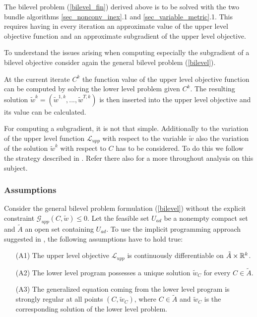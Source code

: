 The bilevel problem (\ref{bilevel_fin}) derived above is to be solved with the two bundle algorithms \ref{sec_nonconv_inex}.1 and \ref{sec_variable_metric}.1.
This requires having in every iteration an approximate value of the upper level objective function and an approximate subgradient of the upper level objective.

To understand the issues arising when computing especially the subgradient of a bilevel objective consider again the general bilevel problem (\ref{bilevel}).

At the current iterate \(C^k\) the function value of the upper level objective function can be computed by solving the lower level problem given \(C^k\).
The resulting solution \(\tilde{w}^k = (\tilde{w}^{1,k},...,\tilde{w}^{T,k})\) is then inserted into the upper level objective and its value can be calculated.

For computing a subgradient, it is not that simple. Additionally to the variation of the upper level function \(\mathcal{L}_{upp}\) with respect to the variable \(\tilde{w}\) also the variation of the solution \(\tilde{w}^k\) with respect to \(C\) has to be considered.
To do this we follow the strategy described in \cite{Outrata1998}. Refer there also for a more throughout analysis on this subject.

\subsubsection{Assumptions}
\label{sec_str_reg}

Consider the general bilevel problem formulation (\ref{bilevel}) without the explicit constraint \(\mathcal{G}_{upp}(C,\tilde{w}) \leq 0\).
Let the feasible set \(U_{ad}\) be a nonempty compact set and \(\tilde{A}\) an open set containing \(U_{ad}\).
To use the implicit programming approach suggested in \cite{Outrata1998},  the following assumptions have to hold true:

\begin{itemize}
\item[(A1)] The upper level objective \(\mathcal{L}_{upp}\) is continuously differentiable on \(\tilde{A}\times \mathbb{R}^k\).
\item[(A2)] The lower level program possesses a unique solution \(\tilde{w}_C\) for every \(C\in \tilde{A}\).
\item[(A3)] The generalized equation coming from the lower level program is strongly regular at all points \((C,\tilde{w}_C)\), where \(C \in \tilde{A}\) and \(\tilde{w}_C\) is the corresponding solution of the lower level problem.
\end{itemize}


